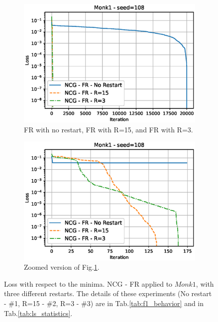 \documentclass[11pt]{article}
\begin{document}
\begin{figure}[H]
     \centering
     \begin{subfigure}[b]{.497\textwidth}
         \centering
         \includegraphics[width=1.1\linewidth]{Images/monk1_fr.eps}
         \caption{FR with no restart, FR with R=15, and FR with R=3.}
         \label{fig:FR_monk_1_non_zoomed}
     \end{subfigure}
     \hfill
     \begin{subfigure}[b]{.497\textwidth}
         \centering
         \includegraphics[width=1.1\linewidth]{Images/monk1_fr_zoomed.eps}
         \caption{Zoomed version of Fig.\ref{fig:FR_monk_1_non_zoomed}.}
         \label{fig:FR_monk_1_zoomed}
     \end{subfigure}
     \caption{Loss with respect to the minima. NCG - FR applied to $Monk1$, with three different restarts. The details of these experiments (No restart - \#1, R=15 - \#2, R=3 - \#3) are in Tab.\ref{tab:f1_behavior} and in Tab.\ref{tab:ls_statistics}.}
     \label{fig:FR_monk_1}
\end{figure}
\end{document}

